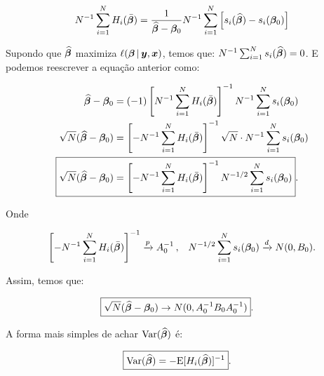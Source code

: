 \documentclass[11pt, oneside, a4paper, article]{article}
\numberwithin{equation}{section}
\begin{document}
\begin{description}
\vspace{-1 em}
\begin{align*}
N^{-1} \sum_{i=1}^{N} 
H_{i} ( \bar{\boldsymbol{\beta}} ) 
=
\frac{1}{\widehat{\boldsymbol{\beta}} - \boldsymbol{\beta}_{0}}
N^{-1} \sum_{i=1}^{N} 
\left[ 
s_{i}( \widehat{\boldsymbol{\beta}} ) - s_{i}( \boldsymbol{\beta}_{0} )
\right]
\end{align*}

Supondo que
$\widehat{\boldsymbol{\beta}}$
maximiza
$\ell (\boldsymbol{\beta} \, | \, \boldsymbol{y}, \boldsymbol{x})$,
temos que:
$N^{-1} \sum_{i=1}^{N} s_{i}(\widehat{\boldsymbol{\beta}}) = 0$.
E podemos reescrever a equação anterior como:

\vspace{-1 em}
\begin{align*}
\widehat{\betavec} - \betavec_{0}
&=
(-1)
\left[ N^{-1} \sum_{i=1}^{N} H_{i} ( \bar{\betavec} ) \right]^{-1}
N^{-1} \sum_{i=1}^{N} s_{i}( \betavec_{0} ) 
\\
\sqrt{N} ( \widehat{\betavec} - \betavec_{0} )
&=
\left[
- N^{-1} \sum_{i=1}^{N} H_{i} ( \bar{\betavec} )
\right]^{-1}
\sqrt{N} \cdot N^{-1} \sum_{i=1}^{N} s_{i}( \betavec_{0} ) 
\\
\Aboxed{
\sqrt{N} ( \widehat{\betavec} - \betavec_{0} )
&=
\left[
- N^{-1} \sum_{i=1}^{N} H_{i} ( \bar{\betavec} )
\right]^{-1}
N^{-1/2} \sum_{i=1}^{N} s_{i}( \betavec_{0} ) }.
\end{align*}

\noindent
Onde

\vspace{-1 em}
\begin{align*}
\left[ 
- N^{-1} \sum_{i=1}^{N}
H_{i} ( \bar{\boldsymbol{\beta}} ) \right]^{-1}
\xrightarrow{p}
A_{0}^{-1} \, ,
&&
N^{-1/2} \sum_{i=1}^{N} s_{i}( \boldsymbol{\beta}_{0} ) 
\xrightarrow{d}
N( 0, B_{0} ).
\end{align*}

\noindent
Assim, temos que:

\vspace{-1 em}
\begin{align*}
\Aboxed{
\sqrt{N} ( \widehat{\betavec} - \betavec_{0} )
\to
N ( 0, A_{0}^{-1} B_{0} A_{0}^{-1} )}.
\end{align*}

A forma mais simples de achar $\text{Var} ( {\widehat{\boldsymbol{\beta}}} )$ é:

\vspace{-1 em}
\begin{align*}
\Aboxed{
\Var( \widehat{\betavec} )
&=
- \E[ H_{i} ( \widehat{\betavec} ) ]^{-1} }.
\end{align*}


\end{description}
\end{document}
